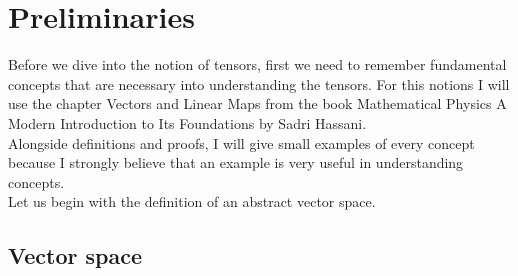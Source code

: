 \documentclass[12pt,a4paper]{article}
\begin{document}
\section{Preliminaries}
Before we dive into the notion of tensors, first we need to remember fundamental concepts that are necessary into understanding the tensors. For this notions I will use the chapter Vectors and Linear Maps from the book Mathematical Physics A Modern Introduction to Its Foundations by Sadri Hassani. \\Alongside definitions and proofs, I will give small examples of every concept because I strongly believe that an example is very useful in understanding concepts.\\
Let us begin with the definition of an abstract vector space.

\subsection{Vector space}
\end{document}
